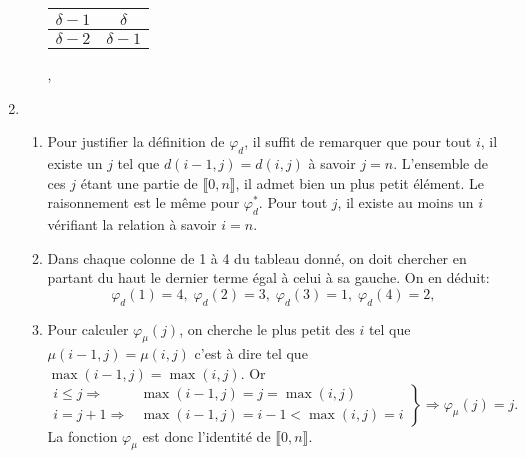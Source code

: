 \begin{enumerate}
\begin{enumerate}
\begin{center}
\begin{tabular}{|c|c|}
  $\delta - 1$ & $\delta$ \\ \hline
  $\delta -2$ & $\delta -1$ \\ \hline  
\end{tabular},
\end{center}
\end{enumerate}
\item 
\begin{enumerate}
  \item Pour justifier la définition de $\varphi_d$, il suffit de remarquer que pour tout $i$, il existe un $j$ tel que $d(i-1,j)= d(i,j)$ à savoir $j=n$. L'ensemble de ces $j$ étant une partie de $\llbracket 0 ,n\rrbracket$, il admet bien un plus petit élément. Le raisonnement est le même pour $\varphi^*_d$. Pour tout $j$, il existe au moins un $i$ vérifiant la relation à savoir $i=n$.
  
  \item Dans chaque colonne de 1 à 4 du tableau donné, on doit chercher en partant du haut le dernier terme égal à celui à sa gauche. On en déduit:
\begin{displaymath}
\varphi_d(1) = 4, \; \varphi_d(2) = 3, \; \varphi_d(3) = 1, \; \varphi_d(4) = 2, \;    
\end{displaymath}

  \item Pour calculer $\varphi_\mu(j)$, on cherche le plus petit des $i$ tel que $\mu(i-1,j) = \mu(i,j)$ c'est à dire tel que $\max(i-1,j) = \max(i,j)$. Or
\begin{displaymath}
\left. 
\begin{aligned}
  i\leq j \Rightarrow& \max(i-1,j) = j = \max(i,j)\\
  i= j + 1 \Rightarrow& \max(i-1,j) = i-1 < \max(i,j) = i
\end{aligned}
\right\rbrace \Rightarrow \varphi_\mu(j) = j.
\end{displaymath}
  La fonction $\varphi_\mu$ est donc l'identité de $\llbracket 0,n \rrbracket$.
\end{enumerate}


\end{enumerate}

